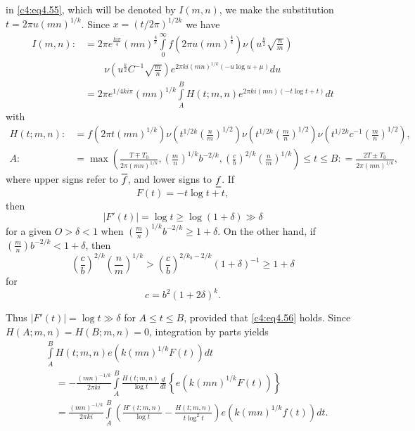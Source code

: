 in \eqref{c4:eq4.55}, which will be denoted by $I(m, n)$, we make the
substitution $t= 2 \pi u(mn)^{1/k}$. \pageoriginale Since $x = (t/2
\pi)^{1/2k}$ we have
\begin{align*}
  I (m, n): & =  2 \pi e^{\frac{k i \pi}{4}} (mn)^{\frac{4}{k}}
  \int\limits_0^\infty  f(2 \pi u (mn)^{\frac{4}{k}}) \nu
  \left(u^{\frac{k}{2}}\sqrt{\frac{n}{m}} \right)\\ 
  & \qquad \nu
  \left(u^{\frac{k}{2}}C^{-1} \sqrt{\frac{m}{n}}\right) e^{2 \pi k i
    (mn)^{1/k} (-u \log u + \mu)}du\\
  & = 2 \pi e^{1/4 k i \pi} (mn)^{1/k} \int\limits_A^B H(t; m, n)e^{2
    \pi ki (mn)(-t \log t + t)}dt 
\end{align*}
with
{\fontsize{9}{11}\selectfont
\begin{align*}
  H (t; m,n) : & = f (2 \pi t (mn)^{1/k}) \nu \left(t^{1/2 k}
  \left(\frac{n}{m}\right)^{1/2}\right) \nu \left(t^{1/2k} \left(\frac{m}{n}
  \right)^{1/2} \right)  \nu \left(t^{1/2k} c^{-1} \left(\frac{m}{n}
  \right)^{1/2} \right),\\
  A: & = \max \left(\frac{T \mp T_0}{2 \pi (mn)^{1/k}},
  \left(\frac{m}{n}\right)^{1/k} b^{-2/k}, \left(
  \frac{c}{b}\right)^{2/k} \left( \frac{n}{m}\right)^{1/k} \right)
  \leq t \leq B: = \frac{2T \pm T_0}{2 \pi (mn)^{1/k}},
\end{align*}}
where upper signs refer to $\overline{f}$, and lower signs to $\underline{f}$. If 
$$
F(t) = - t \log t + t,
$$
then 
$$
|F'(t)| = \log t \geq \log  (1+ \delta) \gg \delta
$$
for a given $O > \delta < 1$ when $\left(\frac{m}{n} \right)^{1/k}
b^{-2/k} \geq 1+ \delta$. On the other hand, if $\left(\frac{m}{n}
\right) b^{-2/k}< 1 + \delta$, then
$$
\left(\frac{c}{b}\right)^{2/k} \left(\frac{n}{m}\right)^{1/k}
>\left(\frac{c}{b} \right)^{2/k_b - 2/k} (1+\delta)^{-1} \geq 1+ \delta
$$
for 
\begin{equation}
  c= b^2 (1+ 2 \delta)^k. \label{c4:eq4.56}
\end{equation}

Thus $|F'(t)|= \log t \gg \delta$ for $A \leq t \leq B$, provided that
\eqref{c4:eq4.56} holds. Since $H(A; m,n)= H(B;m, n)=0$, integration
by parts yields
\begin{align*}
&  \int\limits_A^B H (t; m, n)  e\left(k(mn)^{1/k} F(t)\right) dt\\ 
  &\quad =-
  \frac{(mn)^{-1/k}}{2\pi ki} \int\limits_A^B \frac{H(t; m, n)}{\log
    t} \frac{d}{dt} \left\{e \left(k (mn)^{1/k} F(t)\right) \right\}\\
  &\quad = \frac{(mn)^{-1/k}}{2 \pi ki} \int\limits_A^B \left(\frac{H'(t;
    m,n)}{\log t}- \frac{H (t; m, n)}{t \log^2 t} \right) e\left(k
  (mn)^{1/k} f(t)\right)dt.
\end{align*}

